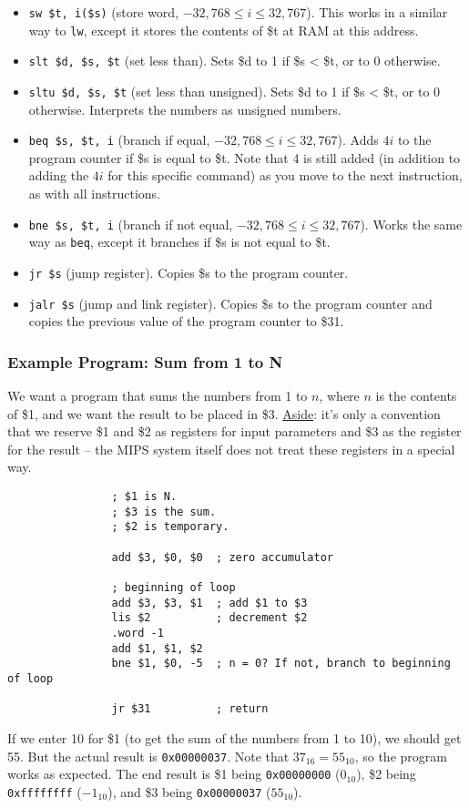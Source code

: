 \documentclass[]{article}
\theoremstyle{definition}
\begin{document}
\begin{itemize}
				\item \verb+sw $t, i($s)+ (store word, $-32,768 \le i \le 32,767$). This works in a similar way to \verb+lw+, except it stores the contents of \$t at RAM at this address.
				\item \verb+slt $d, $s, $t+ (set less than). Sets \$d to 1 if \$s < \$t, or to 0 otherwise.
				\item \verb+sltu $d, $s, $t+ (set less than unsigned). Sets \$d to 1 if \$s < \$t, or to 0 otherwise. Interprets the numbers as unsigned numbers.
				\item \verb+beq $s, $t, i+ (branch if equal, $-32,768 \le i \le 32,767$). Adds $4i$ to the program counter if \$s is equal to \$t. Note that 4 is still added (in addition to adding the $4i$ for this specific command) as you move to the next instruction, as with all instructions. 
				\item \verb+bne $s, $t, i+ (branch if not equal, $-32,768 \le i \le 32,767$). Works the same way as \verb+beq+, except it branches if \$s is not equal to \$t.
				\item \verb+jr $s+ (jump register). Copies \$s to the program counter.
				\item \verb+jalr $s+ (jump and link register). Copies \$s to the program counter and copies the previous value of the program counter to \$31.
			\end{itemize}
		\subsubsection{Example Program: Sum from 1 to N}
			We want a program that sums the numbers from 1 to $n$, where $n$ is the contents of \$1, and we want the result to be placed in \$3. \underline{Aside}: it's only a convention that we reserve \$1 and \$2 as registers for input parameters and \$3 as the register for the result -- the MIPS system itself does not treat these registers in a special way.
			\begin{verbatim}
				; $1 is N.
				; $3 is the sum.
				; $2 is temporary.

				add $3, $0, $0  ; zero accumulator

				; beginning of loop
				add $3, $3, $1  ; add $1 to $3
				lis $2          ; decrement $2
				.word -1
				add $1, $1, $2
				bne $1, $0, -5  ; n = 0? If not, branch to beginning of loop

				jr $31          ; return
			\end{verbatim}
			If we enter 10 for \$1 (to get the sum of the numbers from 1 to 10), we should get 55. But the actual result is \verb+0x00000037+. Note that $37_{16} = 55_{10}$, so the program works as expected. The end result is \$1 being \verb+0x00000000+ ($0_{10}$), \$2 being \verb+0xffffffff+ ($-1_{10}$), and \$3 being \verb+0x00000037+ ($55_{10}$).
\end{document}
